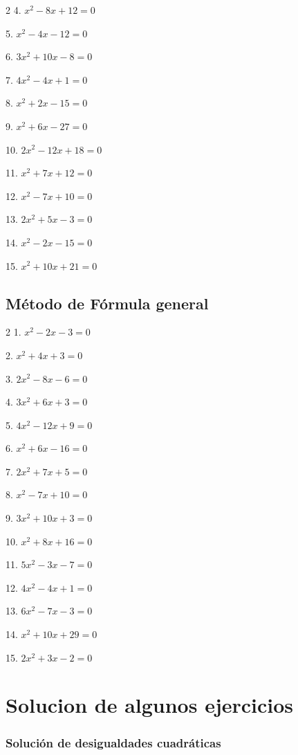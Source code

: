 \documentclass[12pt]{article}
\begin{document}
{\begin{multicols}{2}
4. $x^2 - 8x + 12 = 0$

5. $x^2 - 4x - 12 = 0$

6. $3x^2 + 10x - 8 = 0$

7. $4x^2 - 4x + 1 = 0$

8. $x^2 + 2x - 15 = 0$

9. $x^2 + 6x - 27 = 0$

10. $2x^2 - 12x + 18 = 0$

11. $x^2 + 7x + 12 = 0$

12. $x^2 - 7x + 10 = 0$

13. $2x^2 + 5x - 3 = 0$

14. $x^2 - 2x - 15 = 0$

15. $x^2 + 10x + 21 = 0$
\end{multicols}

\subsection{Método de Fórmula
general}\label{muxe9todo-de-fuxf3rmula-general}
\begin{multicols}{2}
1. $x^2 - 2x - 3 = 0$

2. $x^2 + 4x + 3 = 0$

3. $2x^2 - 8x - 6 = 0$

4. $3x^2 + 6x + 3 = 0$

5. $4x^2 - 12x + 9 = 0$

6. $x^2 + 6x - 16 = 0$

7. $2x^2 + 7x + 5 = 0$

8. $x^2 - 7x + 10 = 0$

9. $3x^2 + 10x + 3 = 0$

10. $x^2 + 8x + 16 = 0$

11. $5x^2 - 3x - 7 = 0$

12. $4x^2 - 4x + 1 = 0$

13. $6x^2 - 7x - 3 = 0$

14. $x^2 + 10x + 29 = 0$

15. $2x^2 + 3x - 2 = 0$
\end{multicols}

\section{Solucion de algunos ejercicios}

\subsubsection*{Solución de desigualdades cuadráticas}

}
\end{document}

